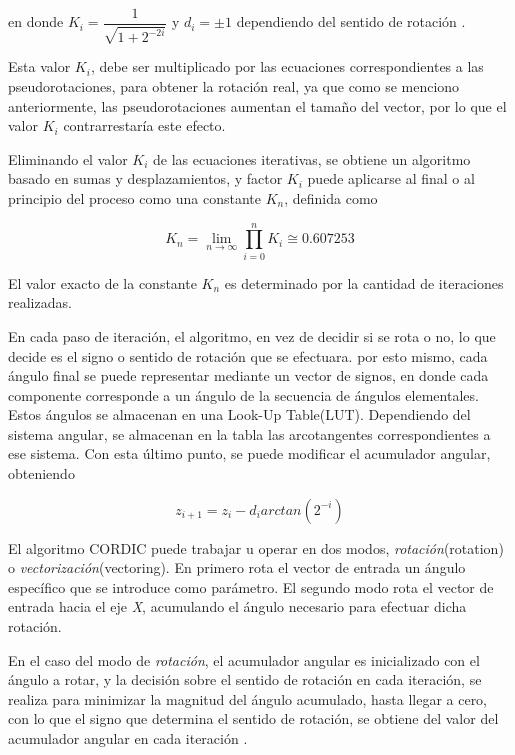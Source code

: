 en donde $K_{i}=\dfrac{1}{\sqrt{1+2^{-2i}}}$ y $d_{i} = \pm 1 $ dependiendo del sentido de rotación \cite{scalable_CORDIC}.

Esta valor $K_{i}$, debe ser multiplicado por las ecuaciones correspondientes a las pseudorotaciones, para obtener la rotación real, ya que como se menciono anteriormente, las pseudorotaciones aumentan el tamaño del vector, por lo que el valor $K_{i}$ contrarrestaría este efecto.

Eliminando el valor $K_{i}$ de las ecuaciones iterativas, se obtiene un algoritmo basado en sumas y desplazamientos, y factor $K_{i}$ puede aplicarse al final o al principio del proceso como una constante $K_{n}$, definida como

\begin{equation}\label{eq:Kn}
K_{n}=\lim_{n  \rightarrow \infty}\prod_{i=0}^{n}K_{i}\cong 0.607253
\end{equation}
 
El valor exacto de la constante $K_{n}$ es determinado por la cantidad de iteraciones realizadas.

En cada paso de iteración, el algoritmo, en vez de decidir si se rota o no, lo que decide es el signo o sentido de rotación que se efectuara. por esto mismo, cada ángulo final se puede representar mediante un vector de signos, en donde cada componente corresponde a un ángulo de la secuencia de ángulos elementales. Estos ángulos se almacenan en una Look-Up Table(LUT). Dependiendo del sistema angular, se almacenan en la tabla las arcotangentes correspondientes a ese sistema.  Con esta último punto, se puede modificar el acumulador angular, obteniendo

\begin{equation}\label{eq:acum_fin}
z_{i+1}=z_{i}-d_{i}arctan(2^{-i})
\end{equation}

El algoritmo CORDIC puede trabajar u operar en dos modos, \textit{rotación}(rotation) o \textit{vectorización}(vectoring). En primero rota el vector de entrada un ángulo específico que se introduce como parámetro. El segundo modo rota el vector de entrada hacia el eje \textit{X}, acumulando el ángulo necesario para efectuar dicha rotación.

En el caso del modo de \textit{rotación}, el acumulador angular es inicializado con el ángulo a rotar, y la decisión sobre el sentido de rotación en cada iteración, se realiza para minimizar la magnitud del ángulo acumulado, hasta llegar a cero, con lo que el signo que determina el sentido de rotación, se obtiene del valor del acumulador angular en cada iteración \cite{DoubleCordic}.


